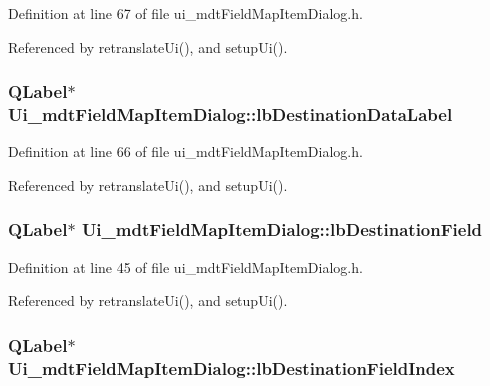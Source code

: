 Definition at line 67 of file ui\-\_\-mdt\-Field\-Map\-Item\-Dialog.\-h.



Referenced by retranslate\-Ui(), and setup\-Ui().

\hypertarget{class_ui__mdt_field_map_item_dialog_a7d06a303f0040c61eddd7120bd192600}{
\subsubsection[{lb\-Destination\-Data\-Label}]{\setlength{\rightskip}{0pt plus 5cm}Q\-Label$\ast$ Ui\-\_\-mdt\-Field\-Map\-Item\-Dialog\-::lb\-Destination\-Data\-Label}}\label{class_ui__mdt_field_map_item_dialog_a7d06a303f0040c61eddd7120bd192600}


Definition at line 66 of file ui\-\_\-mdt\-Field\-Map\-Item\-Dialog.\-h.



Referenced by retranslate\-Ui(), and setup\-Ui().

\hypertarget{class_ui__mdt_field_map_item_dialog_ae1be4528c624e390e535ee2227fcd84b}{
\subsubsection[{lb\-Destination\-Field}]{\setlength{\rightskip}{0pt plus 5cm}Q\-Label$\ast$ Ui\-\_\-mdt\-Field\-Map\-Item\-Dialog\-::lb\-Destination\-Field}}\label{class_ui__mdt_field_map_item_dialog_ae1be4528c624e390e535ee2227fcd84b}


Definition at line 45 of file ui\-\_\-mdt\-Field\-Map\-Item\-Dialog.\-h.



Referenced by retranslate\-Ui(), and setup\-Ui().

\hypertarget{class_ui__mdt_field_map_item_dialog_ad123d6533ba01097e241e0ad26cc01de}{
\subsubsection[{lb\-Destination\-Field\-Index}]{\setlength{\rightskip}{0pt plus 5cm}Q\-Label$\ast$ Ui\-\_\-mdt\-Field\-Map\-Item\-Dialog\-::lb\-Destination\-Field\-Index}}\label{class_ui__mdt_field_map_item_dialog_ad123d6533ba01097e241e0ad26cc01de}


